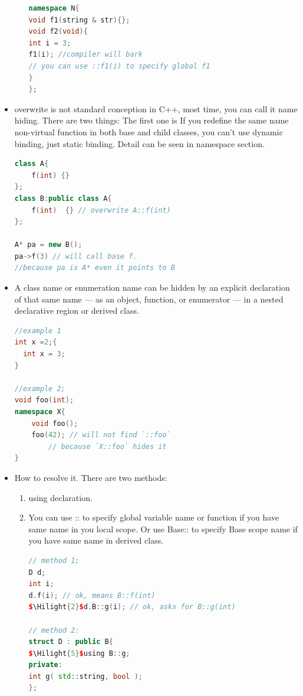 \documentclass[a4paper,12pt,twoside]{book}
\newcommand{\Hilight}[1]{\makebox[0pt][l]{\color{yellow}\rule[-3pt]{#1em}{11pt}}}
\begin{document}
\begin{itemize}
\begin{enumerate}
\begin{lstlisting}[frame=single, language=c++]
namespace N{
void f1(string & str){};
void f2(void){
int i = 3;
f1(i); //compiler will bark
// you can use ::f1(i) to specify global f1
}
};
\end{lstlisting}
\end{enumerate}


\item overwrite is not standard conception in C++, most time, you can call it name hiding. There are two things: The first one is If you redefine the same name non-virtual function in both base and child classes, you can't use dynamic binding, just static binding.  Detail can be seen in namespace section.
\begin{lstlisting}[frame=single, language=c++]
class A{
    f(int) {}
};
class B:public class A{
    f(int)  {} // overwrite A::f(int)
};

A* pa = new B();
pa->f(3) // will call base f.
//because pa is A* even it points to B
\end{lstlisting}

\item A class name or enumeration name can be hidden by an explicit declaration of that same name — as an object, function, or enumerator — in a nested declarative region or derived class.
\begin{lstlisting}[frame=single, language=c++]
//example 1
int x =2;{
  int x = 3;
}

//example 2;
void foo(int);
namespace X{
    void foo();
    foo(42); // will not find `::foo`
        // because `X::foo` hides it
}
\end{lstlisting}

\item How to resolve it.  There are two methods:
\begin{enumerate}
\item using declaration.
\item You can use :: to specify global variable name or function if you have same name in you local scope.  Or use Base:: to specify Base scope name if you have same name in derived class.
\begin{lstlisting}[frame=single, language=c++, mathescape=true]
// method 1;
D d;
int i;
d.f(i); // ok, means B::f(int)
$\Hilight{2}$d.B::g(i); // ok, asks for B::g(int)

// method 2:
struct D : public B{
$\Hilight{5}$using B::g;
private:
int g( std::string, bool );
};
\end{lstlisting}

\end{enumerate}

\end{itemize}
\end{document}
